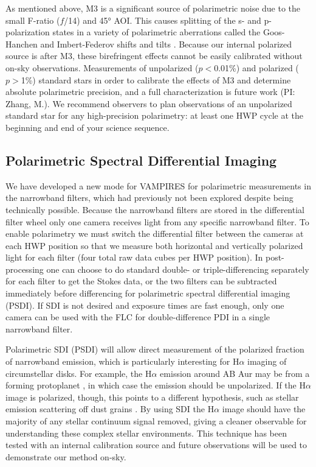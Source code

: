 As mentioned above, M3 is a significant source of polarimetric noise due to the small F-ratio ($f$/14) and \ang{45} AOI. This causes splitting of the s- and p-polarization states in a variety of polarimetric aberrations called the Goos-Hanchen and Imbert-Federov shifts and tilts \citep{schmid_spherezimpol_2018,van_holstein_polarization-dependent_2023}. Because our internal polarized source is after M3, these birefringent effects cannot be easily calibrated without on-sky observations. Measurements of unpolarized ($p<$0.01\%) and polarized ($p>$1\%) standard stars in order to calibrate the effects of M3 and determine absolute polarimetric precision, and a full characterization is future work (PI: Zhang, M.). We recommend observers to plan observations of an unpolarized standard star for any high-precision polarimetry: at least one HWP cycle at the beginning and end of your science sequence.

\subsection{Polarimetric Spectral Differential Imaging}

We have developed a new mode for VAMPIRES for polarimetric measurements in the narrowband filters, which had previously not been explored despite being technically possible. Because the narrowband filters are stored in the differential filter wheel only one camera receives light from any specific narrowband filter. To enable polarimetry we must switch the differential filter between the cameras at each HWP position so that we measure both horizontal and vertically polarized light for each filter (four total raw data cubes per HWP position). In post-processing one can choose to do standard double- or triple-differencing separately for each filter to get the Stokes data, or the two filters can be subtracted immediately before differencing for polarimetric spectral differential imaging (PSDI). If SDI is not desired and exposure times are fast enough, only one camera can be used with the FLC for double-difference PDI in a single narrowband filter.

Polarimetric SDI (PSDI) will allow direct measurement of the polarized fraction of narrowband emission, which is particularly interesting for H$\alpha$ imaging of circumstellar disks. For example, the H$\alpha$ emission around AB Aur may be from a forming protoplanet \citep{currie_images_2022}, in which case the emission should be unpolarized. If the H$\alpha$ image is polarized, though, this points to a different hypothesis, such as stellar emission scattering off dust grains \citep{zhou_uv-optical_2023}. By using SDI the H$\alpha$ image should have the majority of any stellar continuum signal removed, giving a cleaner observable for understanding these complex stellar environments. This technique has been tested with an internal calibration source and future observations will be used to demonstrate our method on-sky.